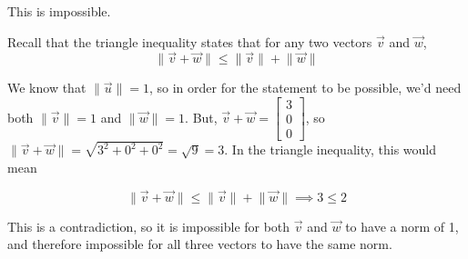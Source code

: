\documentclass[11pt]{article}
\begin{document}
\begin{prob}[(12 pts)]
\begin{subprob}
  

\emptybox{4.75cm}

\begin{solution}
This is impossible.

Recall that the triangle inequality states that for any two vectors $\vec v$ and $\vec w$, $$\lVert \vec v + \vec w \rVert \leq \lVert \vec v \rVert + \lVert \vec w \rVert$$

We know that $\lVert \vec u \rVert = 1$, so in order for the statement to be possible, we'd need both $\lVert \vec v \rVert = 1$ and $\lVert \vec w \rVert = 1$. But, $\vec v + \vec w = \begin{bmatrix} 3 \\ 0 \\ 0 \end{bmatrix}$, so $\lVert \vec v + \vec w \rVert = \sqrt{3^2 + 0^2 + 0^2} = \sqrt{9} = 3$. In the triangle inequality, this would mean

$$\lVert \vec v + \vec w \rVert \leq \lVert \vec v \rVert + \lVert \vec w \rVert \implies 3 \leq 2$$

This is a contradiction, so it is impossible for both $\vec v$ and $\vec w$ to have a norm of 1, and therefore impossible for all three vectors to have the same norm.
\end{solution}

\end{subprob}

\end{prob}

\newpage
\end{document}
